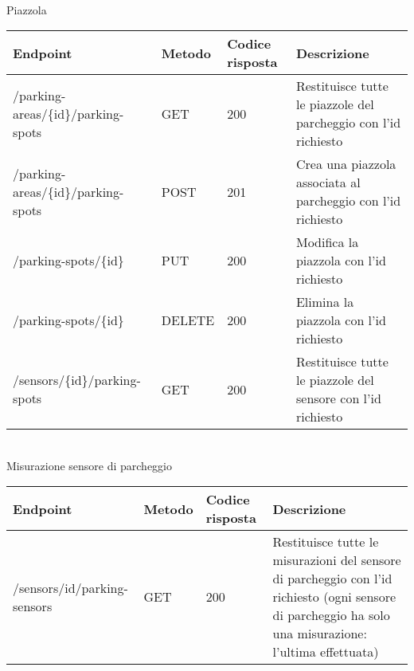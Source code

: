 \leavevmode\newline
\\
Piazzola
\\
\begin{table}
    \begin{tabular}{|p{3.2cm}|p{1.4cm}|p{1.3cm}|p{5.8cm}|} 
    \hline
    Endpoint & Metodo & Codice risposta & Descrizione \\ 
    \hline
    /parking-areas/\{id\}/parking-spots & GET & 200 & Restituisce tutte le piazzole del parcheggio con l'id 
    richiesto \\ 
    \hline
    /parking-areas/\{id\}/parking-spots & POST & 201 & Crea una piazzola associata al parcheggio con l'id 
    richiesto \\ 
    \hline
    /parking-spots/\{id\} & PUT & 200 & Modifica la piazzola con l'id richiesto \\ 
    \hline
    /parking-spots/\{id\} & DELETE & 200 & Elimina la piazzola con l'id richiesto \\ 
    \hline
    /sensors/\{id\}/parking-spots & GET & 200 & Restituisce tutte le piazzole del sensore con l'id 
    richiesto \\ 
    \hline
    \end{tabular}
\end{table}
\leavevmode\newline
\\
Misurazione sensore di parcheggio
\\
\begin{table}
    \begin{tabular}{|p{3.2cm}|p{1.4cm}|p{1.3cm}|p{5.8cm}|} 
    \hline
    Endpoint & Metodo & Codice risposta & Descrizione \\ 
    \hline
    /sensors/{id}/parking-sensors & GET & 200 & Restituisce tutte le misurazioni del sensore di parcheggio con l'id 
    richiesto (ogni sensore di parcheggio ha solo una misurazione: l'ultima effettuata) \\ 
    \hline
    \end{tabular}
\end{table}